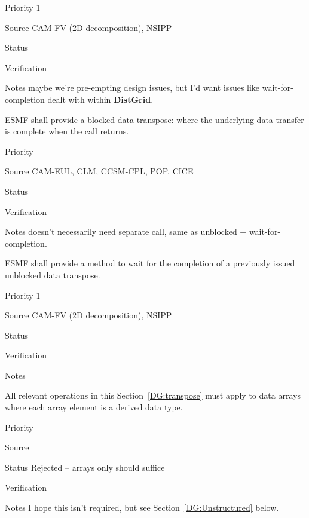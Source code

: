 \begin{reqlist}
\item[Priority] 1
\item[Source] CAM-FV (2D decomposition), NSIPP
\item[Status]
\item[Verification]
\item[Notes] maybe we're pre-empting design issues, but I'd want
  issues like wait-for-completion dealt with within \textbf{DistGrid}.
\end{reqlist}


ESMF shall provide a blocked data transpose: where the underlying
data transfer is complete when the call returns.

\begin{reqlist}
\item[Priority]
\item[Source] CAM-EUL, CLM, CCSM-CPL, POP, CICE
\item[Status]
\item[Verification]
\item[Notes] doesn't necessarily need separate call, same as unblocked
  + wait-for-completion.
\end{reqlist}


ESMF shall provide a method to wait for the completion of a previously
issued unblocked data transpose.

\begin{reqlist}
\item[Priority] 1
\item[Source] CAM-FV (2D decomposition), NSIPP
\item[Status]
\item[Verification]
\item[Notes]
\end{reqlist}


All relevant operations in this Section~\ref{DG:transpose} must apply to
data arrays where each array element is a derived data type.

\begin{reqlist}
\item[Priority]
\item[Source]
\item[Status] Rejected -- arrays only should suffice
\item[Verification]
\item[Notes] I hope this isn't required, but see
  Section~\ref{DG:Unstructured} below.
\end{reqlist}

